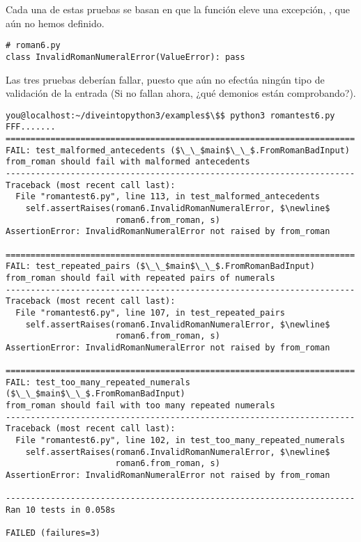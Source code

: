 Cada una de estas pruebas se basan en que la función  eleve una excepción, , que aún no hemos definido.

\noindent\begin{minipage}{\textwidth}
\begin{lstlisting}[mathescape=True]
# roman6.py
class InvalidRomanNumeralError(ValueError): pass
\end{lstlisting}
\end{minipage}

Las tres pruebas deberían fallar, puesto que  aún no efectúa ningún tipo de validación de la entrada (Si no fallan ahora, ¿qué demonios están comprobando?).

\noindent\begin{minipage}{\textwidth}
\begin{lstlisting}[mathescape=True]
you@localhost:~/diveintopython3/examples$\$$ python3 romantest6.py
FFF.......
======================================================================
FAIL: test_malformed_antecedents ($\_\_$main$\_\_$.FromRomanBadInput)
from_roman should fail with malformed antecedents
----------------------------------------------------------------------
Traceback (most recent call last):
  File "romantest6.py", line 113, in test_malformed_antecedents
    self.assertRaises(roman6.InvalidRomanNumeralError, $\newline$
                      roman6.from_roman, s)
AssertionError: InvalidRomanNumeralError not raised by from_roman

======================================================================
FAIL: test_repeated_pairs ($\_\_$main$\_\_$.FromRomanBadInput)
from_roman should fail with repeated pairs of numerals
----------------------------------------------------------------------
Traceback (most recent call last):
  File "romantest6.py", line 107, in test_repeated_pairs
    self.assertRaises(roman6.InvalidRomanNumeralError, $\newline$
                      roman6.from_roman, s)
AssertionError: InvalidRomanNumeralError not raised by from_roman

======================================================================
FAIL: test_too_many_repeated_numerals ($\_\_$main$\_\_$.FromRomanBadInput)
from_roman should fail with too many repeated numerals
----------------------------------------------------------------------
Traceback (most recent call last):
  File "romantest6.py", line 102, in test_too_many_repeated_numerals
    self.assertRaises(roman6.InvalidRomanNumeralError, $\newline$
                      roman6.from_roman, s)
AssertionError: InvalidRomanNumeralError not raised by from_roman

----------------------------------------------------------------------
Ran 10 tests in 0.058s

FAILED (failures=3)
\end{lstlisting}
\end{minipage}

